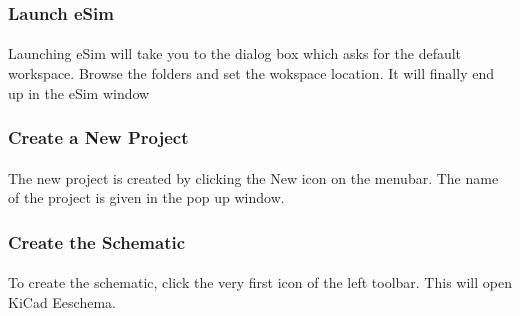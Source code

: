\subsubsection{Launch eSim}

\paragraph{}
 Launching eSim will take you to the dialog box which asks for the default workspace. Browse the folders and set the wokspace location. It will finally end up in the eSim window %

\subsubsection{Create a New Project}

\paragraph{ } The new project is created by clicking the New icon on the
menubar. The name of the project is given in the pop up window.%

\subsubsection{Create the Schematic}

\paragraph{}  To create the schematic, click the very first icon of the
left toolbar.%
This will open KiCad Eeschema.



